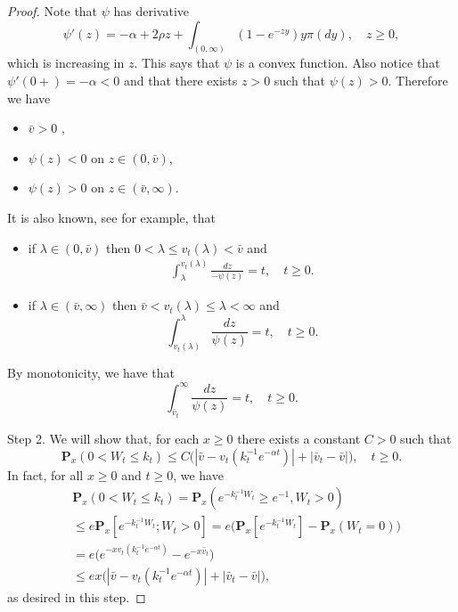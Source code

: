 \documentclass[12pt,a4paper]{amsart}
\theoremstyle{plain}
\theoremstyle{definition}
\numberwithin{equation}{section}
\begin{document}
\begin{proof}
    Note that $\psi$ has derivative
\[
    \psi'(z)
    = -\alpha + 2\rho z + \int_{(0,\infty)}(1-e^{-zy})y\pi(dy),\quad z\geq 0,
\]
    which is increasing in $z$.
    This says that $\psi$ is a convex function.
    Also notice that $\psi'(0+)=-\alpha <0$ and that there exists $z>0$ such that $\psi(z)>0$.
    Therefore we have
\begin{itemize}
\item
    $\bar v > 0$ ,
\item
    $\psi(z) < 0$ on $z\in (0,\bar v)$,
\item
    $\psi(z) > 0 $ on $z\in (\bar v, \infty)$.
\end{itemize}
    It is also known, see \cite[Proposition 3.3]{Li2011Measure-valued} for example, that
\begin{itemize}
\item
    if $\lambda \in (0,\bar v)$ then $0<\lambda \leq v_t(\lambda)<\bar v $ and 
\begin{align}
\label{CSBP: int}
    \int_{\lambda}^{v_t(\lambda)} \frac{dz}{-\psi(z)} = t, \quad t\geq 0.
\end{align}
\item
    if $\lambda \in (\bar v, \infty)$ then $\bar v < v_t(\lambda)\leq \lambda< \infty $ and 
\[
  \int_{v_t(\lambda)}^\lambda\frac{dz}{\psi(z)} = t, \quad t\geq 0.
\]
\end{itemize}
    By monotonicity, we have that
\begin{equation}
\label{eq:svp2}
    \int_{\bar v_t}^\infty \frac{dz}{\psi(z)} = t, \quad t\geq 0.
\end{equation}

    Step 2. We will show that, for each $x \geq 0$ there exists a constant $C>0$ such that
\[
    \mathbf P_{x}(0< W_t\leq k_t)
    \leq C\big(|\bar v- v_t(k_t^{-1}e^{-\alpha t})|+|\bar v_t - \bar v|\big),
    \quad t\geq 0.
\]
    In fact, for all $x\geq 0$ and $t\geq 0$, we have
\begin{equation}\begin{split}
    &\mathbf P_{x}(0<W_t \leq k_t)
    = \mathbf P_{x}( e^{-k_t^{-1}W_t}\geq e^{-1},W_t > 0)
    \\&\leq e \mathbf P_{x}[e^{-k_t^{-1} W_t};W_t > 0]
    =  e\big(\mathbf P_x[e^{-k_t^{-1} W_t}]-\mathbf P_x(W_t = 0)\big)
    \\ &= e\big(e^{-xv_t(k_t^{-1} e^{-\alpha t})}-e^{-x\bar v_t}\big)
    \\&\leq ex \big(|\bar v-v_t(k_t^{-1} e^{-\alpha t})|+ |\bar v_t- \bar v|\big),
\end{split}\end{equation}
    as desired in this step.
   

\end{proof}
\end{document}
